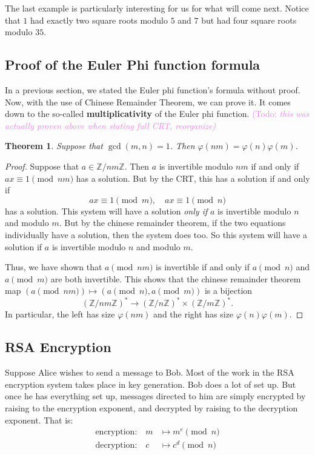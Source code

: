 \documentclass{article}
\theoremstyle{plain}
\newtheorem{theorem}{Theorem}
\theoremstyle{definition}
\theoremstyle{remark}
\numberwithin{theorem}{section}
\newcommand{\KS}[1]{\textcolor{violet}{{\sf (Todo:} {\sl{#1})}}}
\newcommand{\KS}[1]{}
\newcommand{\ZZ}{\mathbb{Z}}
\begin{document}
The last example is particularly interesting for us for what will come next.  Notice that $1$ had exactly two square roots modulo $5$ and $7$ but had four square roots modulo $35$.

\subsection{Proof of the Euler Phi function formula}

In a previous section, we stated the Euler phi function's formula without proof.  Now, with the use of Chinese Remainder Theorem, we can prove it.  It comes down to the so-called \textbf{multiplicativity} of the Euler phi function. \KS{this was actually proven above when stating full CRT, reorganize}

\begin{theorem}
Suppose that $\gcd(m,n)=1$.  Then $\varphi(nm) = \varphi(n)\varphi(m)$.
\end{theorem}

\begin{proof}
Suppose that $a \in \ZZ/nm\ZZ$.  Then $a$ is invertible modulo $nm$ if and only if $ax \equiv 1 \pmod{nm}$ has a solution.  But by the CRT, this has a solution if and only if 
\[
ax \equiv 1 \pmod{m}, \quad ax \equiv 1 \pmod{n}
\]
has a solution.  This system will have a solution \emph{only if} $a$ is invertible modulo $n$ and modulo $m$.  But by the chinese remainder theorem, if the two equations individually have a solution, then the system does too.  So this system will have a solution if $a$ is invertible modulo $n$ and modulo $m$.

Thus, we have shown that $a \pmod{nm}$ is invertible if and only if $a \pmod n$ and $a \pmod m$ are both invertible.  This shows that the chinese remainder theorem map $(a \pmod{nm}) \mapsto (a \pmod{n} , a \pmod{m})$ is a bijection 
\[
 (\ZZ/nm\ZZ)^* \rightarrow  (\ZZ/n\ZZ)^* \times (\ZZ/m\ZZ)^* .
\]
In particular, the left has size $\varphi(nm)$ and the right has size $\varphi(n)\varphi(m)$.
\end{proof}

\subsection{RSA Encryption}

Suppose Alice wishes to send a message to Bob.  Most of the work in the RSA encryption system takes place in key generation.  Bob does a lot of set up.  But once he has everything set up, messages directed to him are simply encrypted by raising to the encryption exponent, and decrypted by raising to the decryption exponent.  That is:
\begin{align*}
\text{encryption:}\quad m &\mapsto m^e \pmod{n} \\
\text{decryption:}\quad c &\mapsto c^d \pmod{n}
\end{align*}
\end{document}
